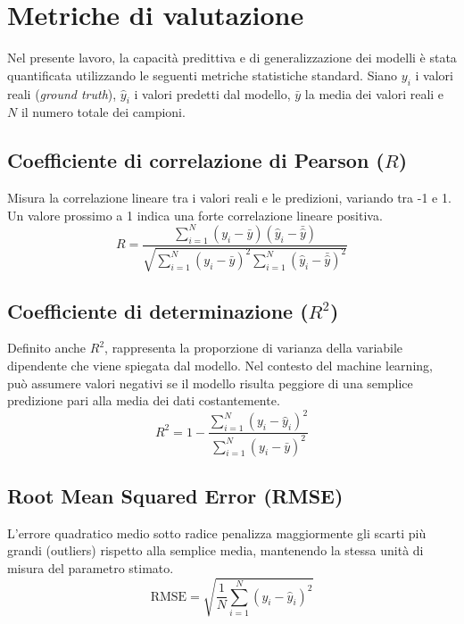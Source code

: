 \documentclass[../main.tex]{subfiles}
\begin{document}
	\appendix
	\chapter{Metriche di valutazione}
	\label{app:metrics}
	
	Nel presente lavoro, la capacità predittiva e di generalizzazione dei modelli è stata quantificata utilizzando le seguenti metriche statistiche standard. Siano $y_i$ i valori reali (\textit{ground truth}), $\hat{y}_i$ i valori predetti dal modello, $\bar{y}$ la media dei valori reali e $N$ il numero totale dei campioni.
	
	\section*{Coefficiente di correlazione di Pearson ($R$)}
	Misura la correlazione lineare tra i valori reali e le predizioni, variando tra -1 e 1. Un valore prossimo a 1 indica una forte correlazione lineare positiva.
	\begin{equation}
		R = \frac{\sum_{i=1}^{N} (y_i - \bar{y})(\hat{y}_i - \bar{\hat{y}})}{\sqrt{\sum_{i=1}^{N} (y_i - \bar{y})^2 \sum_{i=1}^{N} (\hat{y}_i - \bar{\hat{y}})^2}}
	\end{equation}
	
	\section*{Coefficiente di determinazione ($R^2$)}
	Definito anche $R^2$, rappresenta la proporzione di varianza della variabile dipendente che viene spiegata dal modello. Nel contesto del machine learning, può assumere valori negativi se il modello risulta peggiore di una semplice predizione pari alla media dei dati costantemente.
	\begin{equation}
		R^2 = 1 - \frac{\sum_{i=1}^{N} (y_i - \hat{y}_i)^2}{\sum_{i=1}^{N} (y_i - \bar{y})^2}
	\end{equation}
	
	\section*{Root Mean Squared Error (RMSE)}
	L'errore quadratico medio sotto radice penalizza maggiormente gli scarti più grandi (outliers) rispetto alla semplice media, mantenendo la stessa unità di misura del parametro stimato.
	\begin{equation}
		\text{RMSE} = \sqrt{\frac{1}{N} \sum_{i=1}^{N} (y_i - \hat{y}_i)^2}
	\end{equation}
	
\end{document}
